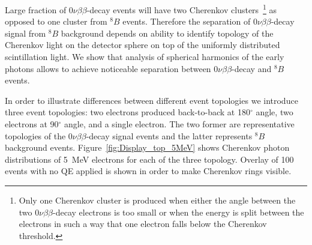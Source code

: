 \documentclass[12pt,twoside,letterpaper]{article}
\newcommand{\vbb}{0\nu\beta\beta}
\newcommand{\B}{^{8}B}
\begin{document}
Large fraction of $\vbb$-decay events will have two Cherenkov clusters~\footnote{Only one Cherenkov cluster is produced when either the angle between the two $\vbb$-decay electrons is too small or when the energy is split between the electrons in such a way that one electron falls below the Cherenkov threshold.} as opposed to one cluster from $\B$ events. Therefore the separation of $\vbb$-decay signal from $\B$ background depends on ability to identify topology of the Cherenkov light on the detector sphere on top of the uniformly distributed scintillation light. We show that analysis of spherical harmonics of the early photons allows to achieve noticeable separation between $\vbb$-decay and $\B$ events.




In order to illustrate differences between different event topologies we introduce three event topologies: two electrons produced back-to-back at 180$^{\circ}$ angle, two electrons at 90$^{\circ}$ angle, and a single electron. The two former are representative topologies of the $\vbb$-decay signal events and the latter represents $\B$ background events. Figure~\ref{fig:Display_top_5MeV} shows Cherenkov photon distributions of 5~MeV electrons for each of the three topology. Overlay of 100 events with no QE applied is shown in order to make Cherenkov rings visible.
\end{document}
